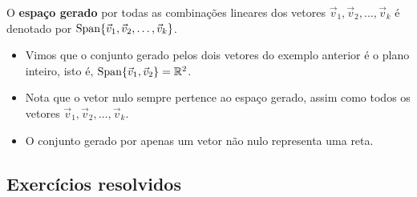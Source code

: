O \textbf{espaço gerado} por todas as combinações lineares dos vetores $\vec{v}_1, \vec{v}_2, \dots, \vec{v}_k$ é denotado por $\operatorname{Span} \{ \vec{v}_1, \vec{v}_2, \dots, \vec{v}_k \}$.

\begin{itemize}
\item Vimos que o conjunto gerado pelos dois vetores do exemplo anterior é o plano inteiro, isto é, $\operatorname{Span} \{ \vec{v}_1, \vec{v}_2 \} = \mathbb{R}^2$.
\item Nota que o vetor nulo sempre pertence ao espaço gerado, assim como todos os vetores $\vec{v}_1, \vec{v}_2, \dots, \vec{v}_k$.
\item O conjunto gerado por apenas um vetor não nulo representa uma reta.
\end{itemize}

\subsection*{Exercícios resolvidos}

\construirExeresol

